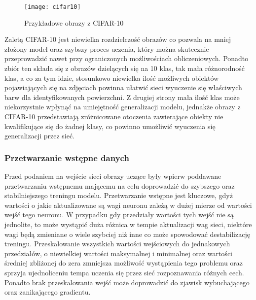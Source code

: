   \begin{figure}[h]
   \centering
   \captionsetup{justification=centering}
   \texttt{[image: cifar10]}
   \caption[Przykładowe obrazy z CIFAR-10 - źródło: Rysunek własny]
   {Przykładowe obrazy z CIFAR-10}
   \label{fig:cifar10}
  \end{figure}

  Zaletą CIFAR-10 jest niewielka rozdzielczość obrazów co pozwala na mniej
  złożony model oraz szybszy proces uczenia, który można skutecznie przeprowadzić
  nawet przy ograniczonych możliwościach obliczeniowych. Ponadto zbiór ten składa
  się z obrazów dzielących się na 10 klas, tak mała różnorodność klas, a co za
  tym idzie, stosunkowo niewielka ilość możliwych obiektów pojawiających się
  na zdjęciach powinna ułatwić sieci wyuczenie się właściwych barw dla
  identyfikowanych powierzchni. Z drugiej strony mała ilość klas może niekorzystnie
  wpłynąć na umiejętność generalizacji modelu, jednakże obrazy z CIFAR-10
  przedstawiają zróżnicowane otoczenia zawierające obiekty nie kwalifikujące
  się do żadnej klasy, co powinno umożliwić wyuczenia się generalizacji przez
  sieć.

\subsubsection{Przetwarzanie wstępne danych} \label{Przetwarzanie wstępne danych}

  Przed podaniem na wejście sieci obrazy uczące były wpierw poddawane
  przetwarzaniu wstępnemu mającemu na celu doprowadzić do szybszego oraz
  stabilniejszego treningu modelu. Przetwarzanie wstępne jest kluczowe, gdyż
  wartości o jakie aktualizowane są wagi neuronu zależą w dużej mierze od
  wartości wejść tego neuronu. W przypadku gdy przedziały wartości tych wejść
  nie są jednolite, to może wystąpić duża różnica w tempie aktualizacji wag
  sieci, niektóre wagi będą zmieniane o wiele szybciej niż inne co może spowodować
  destabilizację treningu. Przeskalowanie wszystkich wartości wejściowych do jednakowych
  przedziałów, o niewielkiej wartości maksymalnej i minimalnej oraz wartości
  średniej zbliżonej do zera zmniejsza możliwość wystąpienia tego problemu
  oraz sprzyja ujednoliceniu tempa uczenia się przez sieć rozpoznawania różnych cech.
  Ponadto brak przeskalowania wejść może doprowadzić do zjawisk wybuchającego
  oraz zanikającego gradientu.

